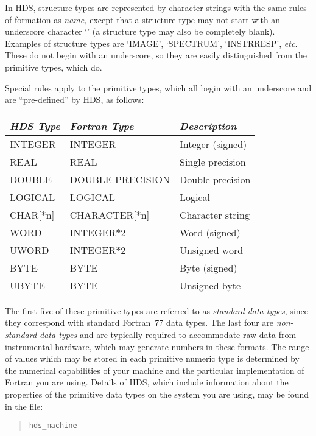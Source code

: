 \documentclass[twoside,11pt]{article}
\newcommand{\htmlref}[2]{#1}
\newcommand{\xlabel}[1]{}
\renewcommand{\_}{\texttt{\symbol{95}}}
\newcommand{\qt}[1]{``#1''}
\newcommand{\st}[1]{{\em{#1}}}
\newcommand{\astar}[0]{{$*$}}
\newcommand{\qt}[1]{{\tt{"}}#1{\tt{"}}}
\newcommand{\astar}[0]{*}
\begin{document}
In HDS, structure types are represented by character strings with the
same rules of formation as \htmlref{\st{name,}}{sect:name} except that
a structure type may not start with an underscore character `\_' (a
structure type may also be completely blank). Examples of structure
types are `IMAGE', `SPECTRUM', `INSTR\_RESP', \st{etc.} These do not
begin with an underscore, so they are easily distinguished from the
primitive types, which do.

Special rules apply to the primitive types, which all begin with an
underscore and are \qt{pre-defined} by HDS, as follows:

\begin{center}
\xlabel{table_of_HDS_data_types}
\begin{tabular}{|l|l|l|}
\hline
\st{HDS Type} & \st{Fortran Type} & \st{Description}\\
\hline \hline
\_INTEGER & INTEGER & Integer (signed)\\
\_REAL & REAL & Single precision\\
\_DOUBLE & DOUBLE PRECISION & Double precision\\
\_LOGICAL & LOGICAL & Logical\\
\_CHAR[{\astar}n] & CHARACTER[{\astar}n] & Character string\\
\hline
\_WORD & INTEGER{\astar}2 & Word (signed)\\
\_UWORD & INTEGER{\astar}2 & Unsigned word\\
\_BYTE & BYTE & Byte (signed)\\
\_UBYTE & BYTE & Unsigned byte\\
\hline
\end{tabular}
\end{center}

The first five of these primitive types are referred to as
\st{standard data types}, since they correspond with standard
Fortran~77 data types. The last four are \st{non-standard data types}
and are typically required to accommodate raw data from instrumental
hardware, which may generate numbers in these formats.  The range of
values which may be stored in each primitive numeric type is
determined by the numerical capabilities of your machine and the
particular implementation of Fortran you are using. Details of HDS,
which include information about the properties of the primitive data
types on the system you are using, may be found in the file:

\small
\begin{quote}
\begin{verbatim}
hds_machine
\end{verbatim}
\end{quote}
\normalsize
\end{document}
